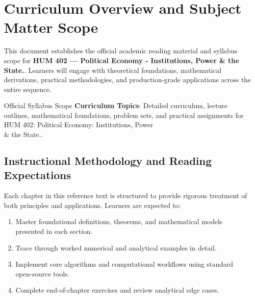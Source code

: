 \section{Curriculum Overview and Subject Matter Scope}

This document establishes the official academic reading material and syllabus scope for \textbf{HUM 402 --- Political Economy - Institutions, Power \& the State.}. Learners will engage with theoretical foundations, mathematical derivations, practical methodologies, and production-grade applications across the entire sequence.

\begin{InsightBox}{Official Syllabus Scope}
  \textbf{Curriculum Topics}: Detailed curriculum, lecture outlines, mathematical foundations, problem sets, and practical assignments for HUM 402: Political Economy: Institutions, Power \\& the State..
\end{InsightBox}

\subsection{Instructional Methodology and Reading Expectations}

Each chapter in this reference text is structured to provide rigorous treatment of both principles and applications. Learners are expected to:
\begin{enumerate}
  \item Master foundational definitions, theorems, and mathematical models presented in each section.
  \item Trace through worked numerical and analytical examples in detail.
  \item Implement core algorithms and computational workflows using standard open-source tools.
  \item Complete end-of-chapter exercises and review analytical edge cases.
\end{enumerate}

